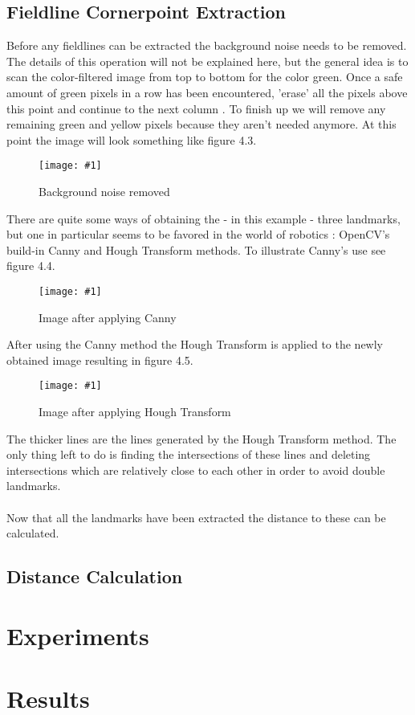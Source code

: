 \documentclass{ba-kecs}
\numberwithin{figure}{section}
\newcommand{\dkepic}[2]{ %
	\begin{figure}[H] %
	\texttt{[image: \#1]}
	\caption{#2}
	\label{#1}
	\end{figure}
}
\begin{document}
\subsection{Fieldline Cornerpoint Extraction}
Before any fieldlines can be extracted the background noise needs to be removed. The details of this operation will not be explained here, but the general idea is to scan the color-filtered image from top to bottom for the color green. Once a safe amount of green pixels in a row has been encountered, 'erase' all the pixels above this point and continue to the next column \cite{ref1}. To finish up we will remove any remaining green and yellow pixels because they aren't needed anymore. At this point the image will look something like figure 4.3.\\
\dkepic{figure_IP3}{Background noise removed}
There are quite some ways of obtaining the - in this example - three landmarks, but one in particular seems to be favored in the world of robotics \cite{ref2}\cite{ref3}: OpenCV's build-in Canny and Hough Transform methods. To illustrate Canny's use see figure 4.4.\\
\dkepic{figure_IP4}{Image after applying Canny}
After using the Canny method the Hough Transform is applied to the newly obtained image resulting in figure 4.5.\\
\dkepic{figure_IP5}{Image after applying Hough Transform}
The thicker lines are the lines generated by the Hough Transform method. The only thing left to do is finding the intersections of these lines and deleting intersections which are relatively close to each other in order to avoid double landmarks.\\ \\
Now that all the landmarks have been extracted the distance to these can be calculated.


\subsection{Distance Calculation}


\section{Experiments}


\section{Results}
\end{document}
